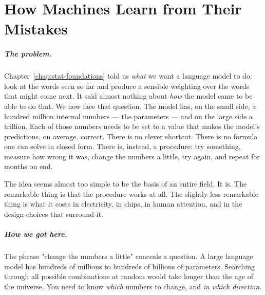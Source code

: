 
\chapter{How Machines Learn from Their Mistakes}
\label{chap:optimization}
\label{ntg:ch2}

\scenelabel
\begin{scenestrip}
\end{scenestrip}

\paragraph{The problem.} Chapter~\ref{chap:stat-foundations} told us \emph{what} we want a language model to do:
look at the words seen so far and produce a sensible weighting over
the words that might come next. It said almost nothing about
\emph{how} the model came to be able to do that. We now face
that question. The model has, on the small side, a hundred
million internal numbers --- the parameters --- and on the
large side a trillion. Each of those numbers needs to be set
to a value that makes the model's predictions, on average,
correct. There is no clever shortcut. There is no formula one
can solve in closed form. There is, instead, a procedure: try
something, measure how wrong it was, change the numbers a
little, try again, and repeat for months on end.

The idea seems almost too simple to be the basis of an entire
field. It is. The remarkable thing is that the procedure works
at all. The slightly less remarkable thing is what it costs in
electricity, in chips, in human attention, and in the design
choices that surround it.

\paragraph{How we got here.} The phrase "change the numbers a little"
conceals a question. A large language model has hundreds of millions
to hundreds of billions of parameters. Searching through all possible
combinations at random would take longer than the age of the universe.
You need to know \emph{which} numbers to change, and \emph{in which
direction}.

